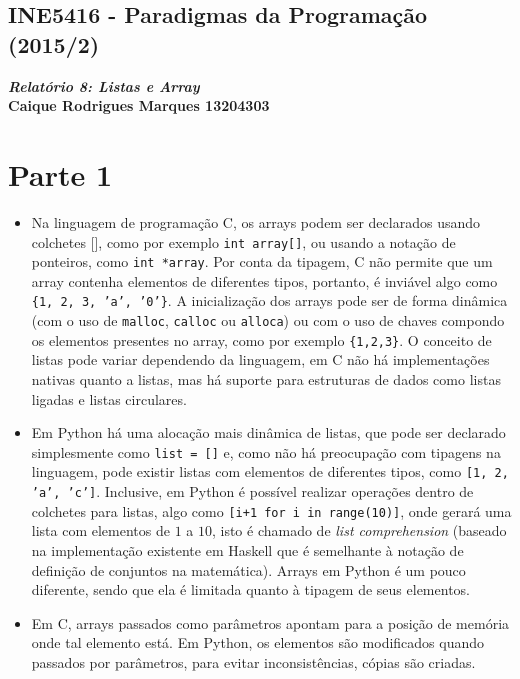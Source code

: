 \documentclass{article}
\begin{document}
    \begin{center}
        \section*{INE5416 - Paradigmas da Programação (2015/2)}
        \textbf{\textit{Relatório 8: Listas e Array} \\
        Caique Rodrigues Marques 13204303}
    \end{center}
    
    \section*{Parte 1}
        \begin{itemize}
            \item Na linguagem de programação C, os arrays podem ser declarados
                usando colchetes [], como por exemplo \texttt{int array[]}, ou
                usando a notação de ponteiros, como \texttt{int *array}. Por
                conta da tipagem, C não permite que um array contenha elementos
                de diferentes tipos, portanto, é inviável algo como
                \texttt{\{1, 2, 3, 'a', '0'\}}. A inicialização dos arrays pode
                ser de forma dinâmica (com o uso de \texttt{malloc},
                \texttt{calloc} ou \texttt{alloca}) ou com o uso de chaves
                compondo os elementos presentes no array, como por exemplo
                \texttt{\{1,2,3\}}. O conceito de listas pode variar dependendo
                da linguagem, em C não há implementações nativas quanto a
                listas, mas há suporte para estruturas de dados como listas
                ligadas e listas circulares.
            
            \item Em Python há uma alocação mais dinâmica de listas, que pode
                ser declarado simplesmente como \texttt{list = []} e, como não
                há preocupação com tipagens na linguagem, pode existir listas
                com elementos de diferentes tipos, como \texttt{[1, 2, 'a',
                'c']}. Inclusive, em Python é possível realizar operações
                dentro de colchetes para listas, algo como \texttt{[i+1 for i
                in range(10)]}, onde gerará uma lista com elementos de $1$ a
                $10$, isto é chamado de \textit{list comprehension} (baseado na
                implementação existente em Haskell que é semelhante à notação
                de definição de conjuntos na matemática). Arrays em Python é um
                pouco diferente, sendo que ela é limitada quanto à tipagem de
                seus elementos.
            
            \item Em C, arrays passados como parâmetros apontam para a posição
                de memória onde tal elemento está. Em Python, os elementos são
                modificados quando passados por parâmetros, para evitar
                inconsistências, cópias são criadas.
        \end{itemize}
        
\end{document}
